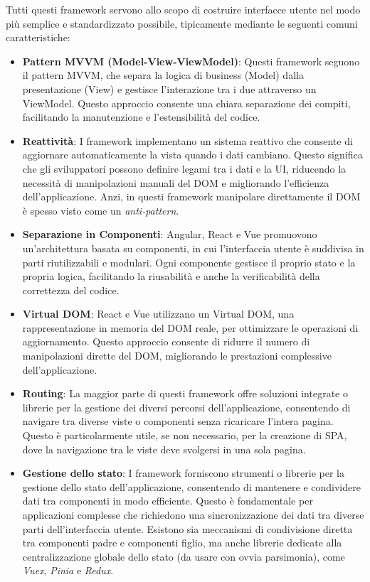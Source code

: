 Tutti questi framework servono allo scopo di costruire interfacce utente nel modo più semplice e standardizzato possibile, tipicamente mediante le seguenti comuni caratteristiche:
\begin{itemize}
    \item \textbf{Pattern MVVM (Model-View-ViewModel)}: Questi framework seguono il pattern MVVM, che separa la logica di business (Model) dalla presentazione (View) e gestisce l'interazione tra i due attraverso un ViewModel. Questo approccio consente una chiara separazione dei compiti, facilitando la manutenzione e l'estensibilità del codice.
    
    \item \textbf{Reattività}: I framework implementano un sistema reattivo che consente di aggiornare automaticamente la vista quando i dati cambiano. Questo significa che gli sviluppatori possono definire legami tra i dati e la UI, riducendo la necessità di manipolazioni manuali del DOM e migliorando l'efficienza dell'applicazione. Anzi, in questi framework manipolare direttamente il DOM è spesso visto come un \emph{anti-pattern}.
    
    \item \textbf{Separazione in Componenti}: Angular, React e Vue promuovono un'architettura basata su componenti, in cui l'interfaccia utente è suddivisa in parti riutilizzabili e modulari. Ogni componente gestisce il proprio stato e la propria logica, facilitando la riusabilità e anche la verificabilità della correttezza del codice.
    
    \item \textbf{Virtual DOM}: React e Vue utilizzano un Virtual DOM, una rappresentazione in memoria del DOM reale, per ottimizzare le operazioni di aggiornamento. Questo approccio consente di ridurre il numero di manipolazioni dirette del DOM, migliorando le prestazioni complessive dell'applicazione.
    
    \item \textbf{Routing}: La maggior parte di questi framework offre soluzioni integrate o librerie per la gestione dei diversi percorsi dell'applicazione, consentendo di navigare tra diverse viste o componenti senza ricaricare l'intera pagina. Questo è particolarmente utile, se non necessario, per la creazione di SPA, dove la navigazione tra le viste deve svolgersi in una sola pagina.
    
    \item \textbf{Gestione dello stato}: I framework forniscono strumenti o librerie per la gestione dello stato dell'applicazione, consentendo di mantenere e condividere dati tra componenti in modo efficiente. Questo è fondamentale per applicazioni complesse che richiedono una sincronizzazione dei dati tra diverse parti dell'interfaccia utente. Esistono sia meccanismi di condivisione diretta tra componenti padre e componenti figlio, ma anche librerie dedicate alla centralizzazione globale dello stato (da usare con ovvia parsimonia), come \emph{Vuex}, \emph{Pinia} e \emph{Redux}.
    

\end{itemize}
